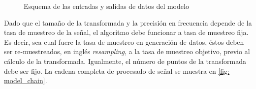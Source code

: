 \begin{figure}[ht!]
{
	}      
	\caption{Esquema de las entradas y salidas de datos del modelo}
	\label{fig: model_schema}
\end{figure}

Dado que el tamaño de la transformada y la precisión en frecuencia depende de la tasa de muestreo de la señal, el algoritmo debe funcionar a tasa de muestreo fija. Es decir, sea cual fuere la tasa de muestreo en generación de datos, éstos deben ser re-muestreados, en inglés \textit{resampling}, a la tasa de muestreo objetivo, previo al cálculo de la transformada. Igualmente, el número de puntos de la transformada debe ser fijo. La cadena completa de procesado de señal se muestra en \ref{fig: model_chain}.
 
